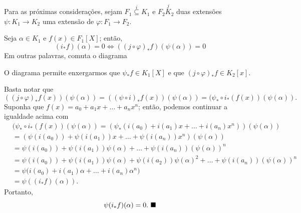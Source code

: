 \documentclass[../algebraIII_notes.tex]{subfiles}
\begin{document}
Para as próximas considerações, sejam \(F_1\stackrel{i}\subseteq K_1\) e \(F_2\stackrel{j}K_2\) duas extensões \(\psi :K_1\rightarrow K_2\) uma extensão de \(\varphi :F_1\rightarrow F_2\).
\begin{lemma*}
	Seja \(\alpha \in K_1\) e \(f(x)\in F_1[X]\); então,
	\[
		(i_{*}f)(\alpha )=0 \Longleftrightarrow ((j\circ \varphi )_{*}f)(\psi(\alpha ) )=0
	\]
	Em outras palavras, comuta o diagrama
	\begin{center}
	\end{center}
	O diagrama permite enxergarmos que \(\psi_{*}f\in K_1[X]\) e que \((j\circ \varphi )_{*}f\in K_2[x]\).
\end{lemma*}
\begin{proof*}
	Basta notar que
	\[
		((j\circ \varphi )_{*} f(x))(\psi (\alpha ))= ((\psi \circ i)_{*}f(x))(\psi (\alpha )) = (\psi_{*}\circ i_{*}(f(x))(\psi (\alpha )).
	\]
	Suponha que \(f(x)=a_{0}+a_1x+\dotsc +a_{n}x^{n}\); então, podemos continuar a igualdade acima com
	\begin{align*}
		 & (\psi_{*}\circ i_{*}(f(x))(\psi (\alpha ))  = (\psi _{*}(i(a_{0})+i(a_{1})x+\dotsc +i(a_{n})x^{n}))(\psi (\alpha ))           \\
		 & = (\psi (i(a_{0}))+\psi (i(a_1))x+\dotsc +\psi (i(a_{n}))x^{n})(\psi (\alpha ))                                               \\
		 & = \psi (i(a_{0}))+\psi (i(a_1))\psi (\alpha )+\dotsc +\psi (i(a_{n}))(\psi (\alpha ))^{n}                                     \\
		 & = \psi (i(a_{0}))+\psi (i(a_{1}))\psi (\alpha )+\psi (i(a_{2}))\psi (\alpha )^{2}+\dotsc +\psi (i(a_{n}))(\psi (\alpha ))^{n} \\
		 & = \psi \biggl(i(a_{0})+i(a_{1})\alpha +\dotsc +i(a_{n})\alpha ^{n}\biggr)                                                     \\
		 & = \psi ((i_{*}f)(\alpha )).
	\end{align*}
	Portanto,
	\[
		\psi (i_{*}f)(\alpha ) = 0. \text{ $\blacksquare$}
	\]
\end{proof*}
\end{document}
